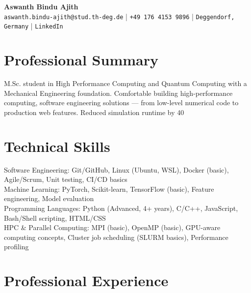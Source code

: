 \documentclass[11pt,a4paper]{article}
\begin{document}
\begin{center}
    {\LARGE\bfseries Aswanth Bindu Ajith}\\[4pt]
    \texttt{aswanth.bindu-ajith@stud.th-deg.de} | \texttt{+49 176 4153 9896} | \texttt{Deggendorf, Germany} | \texttt{LinkedIn}
\end{center}

\section{Professional Summary}
M.Sc. student in High Performance Computing and Quantum Computing with a Mechanical Engineering foundation. Comfortable building high-performance computing, software engineering solutions — from low-level numerical code to production web features. Reduced simulation runtime by 40%

\section{Technical Skills}

Software Engineering: Git/GitHub, Linux (Ubuntu, WSL), Docker (basic), Agile/Scrum, Unit testing, CI/CD basics\\

Machine Learning: PyTorch, Scikit-learn, TensorFlow (basic), Feature engineering, Model evaluation\\

Programming Languages: Python (Advanced, 4+ years), C/C++, JavaScript, Bash/Shell scripting, HTML/CSS\\

HPC & Parallel Computing: MPI (basic), OpenMP (basic), GPU-aware computing concepts, Cluster job scheduling (SLURM basics), Performance profiling


\section{Professional Experience}
\end{document}
